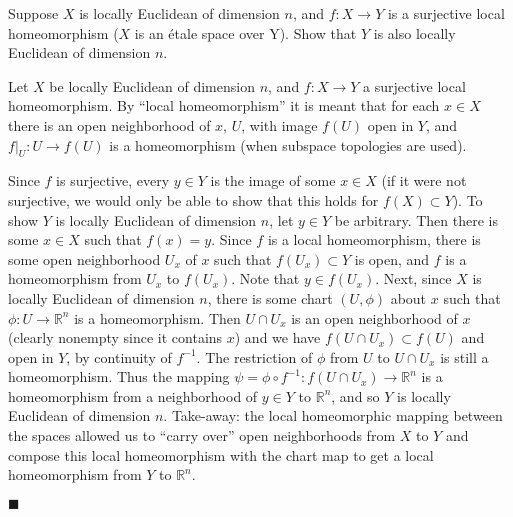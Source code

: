 \documentclass[12pt]{article}
\renewcommand{\qed}{\hfill$\blacksquare$}
\renewenvironment{proof}{\begin{addmargin}[1em]{0em}\begin{newproof}}{\end{newproof}\end{addmargin}\qed}
\newenvironment{problem}[2][Problem]{\begin{trivlist}
\item[\hskip \labelsep {\bfseries #1}\hskip \labelsep {\bfseries #2.}]}{\end{trivlist}}
\begin{document}
\begin{problem}{2-24}
Suppose $X$ is locally Euclidean of dimension $n$, and $f:X\rightarrow Y$ is a surjective local homeomorphism {\color{red} ($X$ is an \'etale space over Y)}. Show that $Y$ is also locally Euclidean of dimension $n$.
\end{problem}
\begin{proof}
Let $X$ be locally Euclidean of dimension $n$, and $f:X\rightarrow Y$ a surjective local homeomorphism. By ``local homeomorphism'' it is meant that for each $x\in X$ there is an open neighborhood of $x$, $U$, with image $f\left(U\right)$ open in $Y$, and $f|_{U}:U\rightarrow f\left(U\right)$ is a homeomorphism (when subspace topologies are used).

Since $f$ is surjective, every $y\in Y$ is the image of some $x \in X$ {\color{red} (if it were not surjective, we would only be able to show that this holds for $f\left(X\right)\subset Y$)}. To show $Y$ is locally Euclidean of dimension $n$, let $y\in Y$ be arbitrary. Then there is some $x\in X$ such that $f\left(x\right)=y$. Since $f$ is a local homeomorphism, there is some open neighborhood $U_x$ of $x$ such that $f\left(U_x\right)\subset Y$ is open, and $f$ is a homeomorphism from $U_x$ to $f\left(U_x\right)$. Note that $y \in f\left(U_x\right)$. Next, since $X$ is locally Euclidean of dimension $n$, there is some chart $\left(U,\phi\right)$ about $x$ such that $\phi:U\rightarrow \mathbb{R}^n$ is a homeomorphism. Then $U \cap U_x $ is an open neighborhood of $x$ (clearly nonempty since it contains $x$) and we have $f\left(U\cap U_x\right) \subset f\left(U\right)$ and open in $Y$, by continuity of $f^{-1}$. The restriction of $\phi$ from $U$ to $U \cap U_x$ is still a homeomorphism. Thus the mapping $\psi = \phi \circ f^{-1}: f\left(U\cap U_x\right) \rightarrow \mathbb{R}^n$ is a homeomorphism from a neighborhood of $y \in Y$ to $\mathbb{R}^n$, and so $Y$ is locally Euclidean of dimension $n$. {\color{red} Take-away: the local homeomorphic mapping between the spaces allowed us to ``carry over'' open neighborhoods from $X$ to $Y$ and compose this local homeomorphism with the chart map to get a local homeomorphism from $Y$ to $\mathbb{R}^n$.}
\end{proof}
\end{document}
